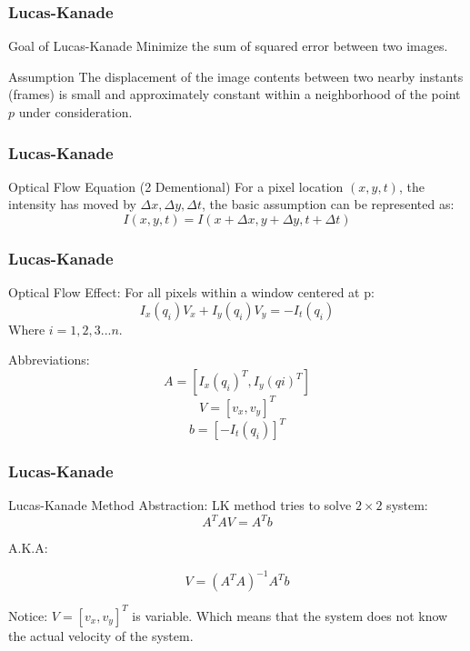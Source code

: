 \begin{frame}
\frametitle{Lucas-Kanade}

\begin{blueblock}{Goal of Lucas-Kanade}
Minimize the sum of squared error between two images.
\end{blueblock}

\begin{redblock}{Assumption}
The displacement of the image contents between two nearby instants
(frames) is small and approximately constant within a neighborhood of
the point $p$ under consideration.
\end{redblock}

\end{frame}

\begin{frame}
\frametitle{Lucas-Kanade}
  \begin{blueblock}{Optical Flow Equation (2 Dementional)}
For a pixel location $(x, y, t)$, the intensity has moved by $\Delta
x, \Delta y, \Delta t$, the basic assumption can be represented as:
$$I(x, y, t) = I(x + \Delta x, y + \Delta y, t + \Delta t)$$

  \end{blueblock}
\end{frame}

\begin{frame}
\frametitle{Lucas-Kanade}
  \begin{blueblock}{Optical Flow Effect:}
For all pixels within a window centered at p:
$$I_x(q_i)V_x + I_y(q_i)V_y = -I_t(q_i) $$
Where  $i = 1,2,3 ... n$.

  \end{blueblock}

  \begin{greyblock}{Abbreviations:}
$$ A = [ I_x(q_i)^T, I_y(qi)^T] $$
$$ V = [v_x, v_y]^T $$
$$ b = [-I_t(q_i)]^T $$
  \end{greyblock}
\end{frame}

\begin{frame}
\frametitle{Lucas-Kanade}
  \begin{blueblock}{Lucas-Kanade Method Abstraction:}
LK method tries to solve $2 \times 2$ system:
$$A^TAV = A^Tb$$

A.K.A:

$$V = (A^TA)^{-1}A^Tb$$
  \end{blueblock}

  \begin{greyblock}{Notice:}
    $V = [v_x, v_y]^T$ is variable. Which means that the system does
    not know the actual velocity of the system.
  \end{greyblock}
\end{frame}


